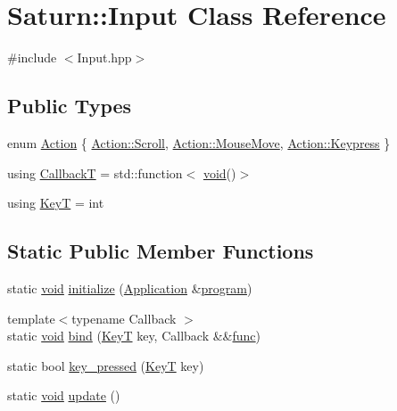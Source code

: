 \hypertarget{class_saturn_1_1_input}{}\section{Saturn\+:\+:Input Class Reference}
\label{class_saturn_1_1_input}


{\ttfamily \#include $<$Input.\+hpp$>$}

\subsection*{Public Types}
\begin{DoxyCompactItemize}
\item 
enum \mbox{\hyperlink{class_saturn_1_1_input_a504445f408b1575505008e8064633f07}{Action}} \{ \mbox{\hyperlink{class_saturn_1_1_input_a504445f408b1575505008e8064633f07a105078d294d30c978ca2badf7f376934}{Action\+::\+Scroll}}, 
\mbox{\hyperlink{class_saturn_1_1_input_a504445f408b1575505008e8064633f07afd060c0c157323f1e43e0704d4f3ffc8}{Action\+::\+Mouse\+Move}}, 
\mbox{\hyperlink{class_saturn_1_1_input_a504445f408b1575505008e8064633f07a5e3a01434d9d4b398d72303d875ee883}{Action\+::\+Keypress}}
 \}
\item 
using \mbox{\hyperlink{class_saturn_1_1_input_a317963f1b9872a1ef03ec40f56df4f4c}{CallbackT}} = std\+::function$<$ \mbox{\hyperlink{glad_8h_a950fc91edb4504f62f1c577bf4727c29}{void}}()$>$
\item 
using \mbox{\hyperlink{class_saturn_1_1_input_adb9bc8dbf6aa0a09f86efd787a96b768}{KeyT}} = int
\end{DoxyCompactItemize}
\subsection*{Static Public Member Functions}
\begin{DoxyCompactItemize}
\item 
static \mbox{\hyperlink{glad_8h_a950fc91edb4504f62f1c577bf4727c29}{void}} \mbox{\hyperlink{class_saturn_1_1_input_af711c6ae10388081b7ff5e5ee6c4b3b1}{initialize}} (\mbox{\hyperlink{class_saturn_1_1_application}{Application}} \&\mbox{\hyperlink{glad_8h_a5d503ac2e8a859fe5ec03de21c8b6a3b}{program}})
\item 
{\footnotesize template$<$typename Callback $>$ }\\static \mbox{\hyperlink{glad_8h_a950fc91edb4504f62f1c577bf4727c29}{void}} \mbox{\hyperlink{class_saturn_1_1_input_a46a0f0aa3de208190859f18b5e881580}{bind}} (\mbox{\hyperlink{class_saturn_1_1_input_adb9bc8dbf6aa0a09f86efd787a96b768}{KeyT}} key, Callback \&\&\mbox{\hyperlink{glad_8h_a18ae3ab36a07e388833b568cfdfa90c8}{func}})
\item 
static bool \mbox{\hyperlink{class_saturn_1_1_input_a9b5743eac7f0f5dd2af010abad8b0658}{key\+\_\+pressed}} (\mbox{\hyperlink{class_saturn_1_1_input_adb9bc8dbf6aa0a09f86efd787a96b768}{KeyT}} key)
\item 
static \mbox{\hyperlink{glad_8h_a950fc91edb4504f62f1c577bf4727c29}{void}} \mbox{\hyperlink{class_saturn_1_1_input_ae60cd4de37be05c80ee79955daeb98d0}{update}} ()
\end{DoxyCompactItemize}


